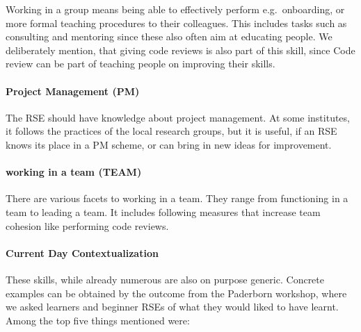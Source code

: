 \documentclass[a4paper
]{article}
\begin{document}
Working in a group means being able to effectively perform
e.g.~onboarding, or more formal teaching procedures to their colleagues.
This includes tasks such as consulting and mentoring since these also
often aim at educating people. We deliberately mention, that giving code
reviews is also part of this skill, since Code review can be part of
teaching people on improving their skills.

\hypertarget{project-management-pm}{%
\paragraph{Project Management (PM)}\label{project-management-pm}}

The RSE should have knowledge about project management. At some
institutes, it follows the practices of the local research groups, but
it is useful, if an RSE knows its place in a PM scheme, or can bring in
new ideas for improvement.

\hypertarget{working-in-a-team-team}{%
\paragraph{working in a team (TEAM)}\label{working-in-a-team-team}}

There are various facets to working in a team. They range from
functioning in a team to leading a team. It includes following measures
that increase team cohesion like performing code reviews.

\hypertarget{current-day-contextualization}{%
\paragraph{Current Day
Contextualization}\label{current-day-contextualization}}

These skills, while already numerous are also on purpose generic.
Concrete examples can be obtained by the outcome from the Paderborn
workshop, where we asked learners and beginner RSEs of what they would
liked to have learnt. Among the top five things mentioned were:
\end{document}
